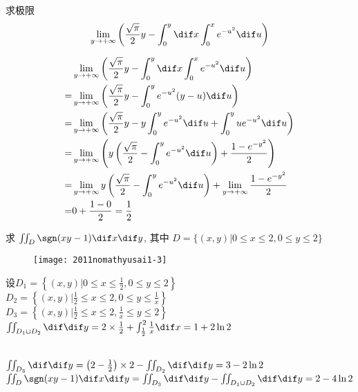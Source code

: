 \documentclass[color=green,titlestyle=hang]{elegantbook}%
\begin{document}
\begin{exercise}
求极限\[\lim_{y\to+\infty}\left(\frac{\sqrt{\pi}}{2}y-\int_0^y\dif x\int_0^xe^{-u^2}\dif u\right)\]
\end{exercise}\begin{solution}
\begin{align*}
&\lim_{y\to+\infty}\left(\frac{\sqrt{\pi}}{2}y-\int_0^y\dif x\int_0^xe^{-u^2}\dif u\right)\\
=&\lim_{y\to+\infty}\left(\frac{\sqrt{\pi}}{2}y-\int_0^ye^{-u^2}(y-u)\dif u\right)\\
=&\lim_{y\to+\infty}\left(\frac{\sqrt{\pi}}{2}y-y\int_0^ye^{-u^2}\dif u+\int_0^yue^{-u^2}\dif u\right)\\
=&\lim_{y\to+\infty}\left(y\left(\frac{\sqrt{\pi}}{2}-\int_0^ye^{-u^2}\dif u\right)+\frac{1-e^{-y^2}}{2}\right)\\
=&\lim_{y\to+\infty}y\left(\frac{\sqrt{\pi}}{2}-\int_0^ye^{-u^2}\dif u\right)+\lim_{y\to+\infty}\frac{1-e^{-y^2}}{2}\\
=&0+\frac{1-0}{2}=\frac{1}{2}
\end{align*}	
\end{solution}

\begin{example}
求 $\iint_D\sgn(xy-1)\dif x\dif y$, 其中 $D=\{(x,y)|0\leqslant x\leqslant2, 0\leqslant y\leqslant2\}$	
\end{example}\begin{Solution}
{\begin{wrapfigure}{r}{0.45\textwidth}\vspace*{-2em}\texttt{[image: 2011nomathyusai1-3]}\end{wrapfigure}
	设$D_1=\left\{(x,y)\bigg|0\leqslant x\leqslant\frac{1}{2}, 0\leqslant y\leqslant2\right\}$\, \\
	$D_2=\left\{(x,y)\bigg|\frac{1}{2}\leqslant x\leqslant2, 0\leqslant y\leqslant\frac{1}{x}\right\}$\\
	$D_3=\left\{(x,y)\bigg|\frac{1}{2}\leqslant x\leqslant2, \frac{1}{x}\leqslant y\leqslant2\right\}$\\
	$\iint_{D_1\cup D_2}\dif \dif y=2\times\frac{1}{2}+\int_{\frac{1}{2}}^2\frac{1}{x}\dif x=1+2\ln2$}\\
$\iint_{D_3}\dif \dif y=\left(2-\frac{1}{2}\right)\times2-\iint_{D_2}\dif \dif y=3-2\ln2$\\
$\iint_D\sgn(xy-1)\dif x\dif y=\iint_{D_3}\dif \dif y-\iint_{D_1\cup D_2}\dif \dif y=2-4\ln2$
\end{Solution}
\end{document}
